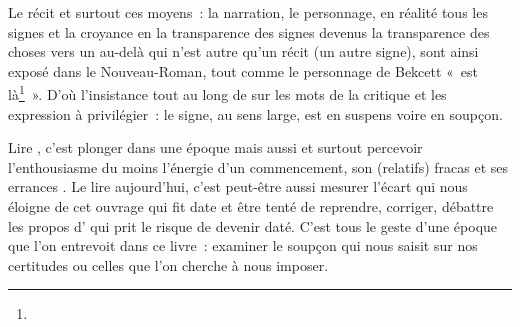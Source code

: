 \documentclass[12pt, a4paper]{article}
\begin{document}
Le récit et surtout ces moyens~: la narration, le personnage, en réalité tous les signes et la croyance en la transparence des signes devenus la transparence des choses vers un au-delà qui n'est autre qu'un récit (un autre signe), sont ainsi exposé dans le Nouveau-Roman, tout comme le personnage de Bekcett «~est là\footnote{}~». D'où l'insistance tout au long de \punr{} sur les mots de la critique et les expression à privilégier~: le signe, au sens large, est en suspens voire en soupçon.










\newpage

\vspace*{4cm}


Lire \punr, c'est plonger dans une époque mais aussi et surtout percevoir l'enthousiasme du moins l'énergie d'un commencement, son (relatifs) fracas et ses errances %
. Le lire aujourd'hui, c'est peut-être aussi mesurer l'écart qui nous éloigne de cet ouvrage qui fit date et être tenté de reprendre, corriger, débattre les propos d'\robbe{} qui prit le risque de devenir daté. C'est tous le geste d'une époque que l'on entrevoit dans ce livre~: examiner le soupçon qui nous saisit sur nos certitudes ou celles que l'on cherche à nous imposer.
\end{document}
